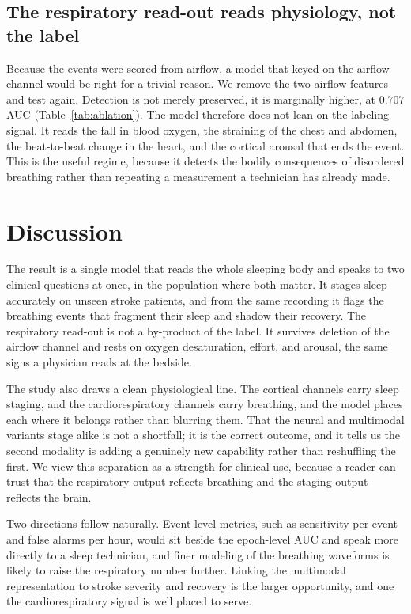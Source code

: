 \documentclass[journal]{IEEEtran}
\newcommand{\noflowAuc}{0.707} %
\begin{document}
\subsection{The respiratory read-out reads physiology, not the label}
\label{sec:noflow}
Because the events were scored from airflow, a model that keyed on the airflow channel would
be right for a trivial reason. We remove the two airflow features and test again. Detection is
not merely preserved, it is marginally higher, at $\noflowAuc$ AUC (Table~\ref{tab:ablation}).
The model therefore does not lean on the labeling signal. It reads the fall in blood oxygen,
the straining of the chest and abdomen, the beat-to-beat change in the heart, and the cortical
arousal that ends the event. This is the useful regime, because it detects the bodily
consequences of disordered breathing rather than repeating a measurement a technician has
already made.

\section{Discussion}
The result is a single model that reads the whole sleeping body and speaks to two clinical
questions at once, in the population where both matter. It stages sleep accurately on unseen
stroke patients, and from the same recording it flags the breathing events that fragment their
sleep and shadow their recovery. The respiratory read-out is not a by-product of the label. It
survives deletion of the airflow channel and rests on oxygen desaturation, effort, and
arousal, the same signs a physician reads at the bedside.

The study also draws a clean physiological line. The cortical channels carry sleep staging, and
the cardiorespiratory channels carry breathing, and the model places each where it belongs
rather than blurring them. That the neural and multimodal variants stage alike is not a
shortfall; it is the correct outcome, and it tells us the second modality is adding a genuinely
new capability rather than reshuffling the first. We view this separation as a strength for
clinical use, because a reader can trust that the respiratory output reflects breathing and the
staging output reflects the brain.

Two directions follow naturally. Event-level metrics, such as sensitivity per event and false
alarms per hour, would sit beside the epoch-level AUC and speak more directly to a sleep
technician, and finer modeling of the breathing waveforms is likely to raise the respiratory
number further. Linking the multimodal representation to stroke severity and recovery is the
larger opportunity, and one the cardiorespiratory signal is well placed to serve.
\end{document}
